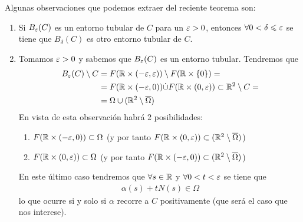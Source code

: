 \begin{observacion}
    Algunas observaciones que podemos extraer del reciente teorema son:
    \begin{enumerate}
        \item Si $B_\varepsilon(C)$ es un entorno tubular de $C$ para un $\varepsilon>0$, entonces $\forall 0<\delta \leqslant \varepsilon$ se tiene que $B_\delta(C)$ es otro entorno tubular de $C$.
        
        \item Tomamos $\varepsilon>0$ y sabemos que $B_\varepsilon(C)$ es un entorno tubular. Tendremos que
        \begin{align*}
            B_\varepsilon(C) \setminus C &= F(\mathbb{R}\times(-\varepsilon, \varepsilon)) \setminus F(\mathbb{R}\times\{0\})=\\
            &=F(\mathbb{R}\times(-\varepsilon, 0))\dot{\cup}F(\mathbb{R}\times(0,\varepsilon)) \subset \mathbb{R}^2 \setminus C =\\
            &= \Omega \cup (\mathbb{R}^2 \setminus \overline{\Omega})
        \end{align*}
        En vista de esta observación habrá 2 posibilidades:
        \begin{enumerate}
            \item $F(\mathbb{R}\times(-\varepsilon, 0))\subset \Omega$ (y por tanto $F(\mathbb{R}\times(0,\varepsilon))\subset (\mathbb{R}^2 \setminus \overline{\Omega})$)
            \item $F(\mathbb{R}\times(0,\varepsilon))\subset \Omega$ (y por tanto $F(\mathbb{R}\times(-\varepsilon, 0))\subset (\mathbb{R}^2 \setminus \overline{\Omega})$)
        \end{enumerate}
        En este último caso tendremos que $\forall s \in \mathbb{R}$ y $\forall 0<t<\varepsilon$ se tiene que
        \begin{gather*}
            \alpha(s) + tN(s) \in \Omega
        \end{gather*}
        lo que ocurre si y solo si $\alpha$ recorre a $C$ positivamente (que será el caso que nos interese).
        \begin{figure}[H]
            \centering
            \begin{subfigure}[b]{0.35\linewidth}
                \centering
\end{subfigure}
\end{figure}
\end{enumerate}
\end{observacion}
